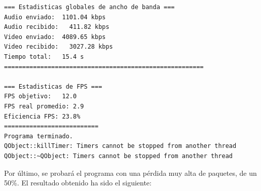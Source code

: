 \begin{adjustbox}{max width=\textwidth}
\begin{lstlisting}[language=bash,basicstyle=\ttfamily\scriptsize]
=== Estadisticas globales de ancho de banda ===
Audio enviado:	1101.04 kbps
Audio recibido:   411.82 kbps
Video enviado:	4089.65 kbps
Video recibido:   3027.28 kbps
Tiempo total: 	15.4 s
=======================================================

=== Estadisticas de FPS ===
FPS objetivo: 	12.0
FPS real promedio: 2.9
Eficiencia FPS:	23.8%
==========================
Programa terminado.
QObject::killTimer: Timers cannot be stopped from another thread
QObject::~QObject: Timers cannot be stopped from another thread
\end{lstlisting}
\end{adjustbox}
\vspace{\baselineskip}

\newpage

Por último, se probará el programa con una pérdida muy alta de paquetes, de un 50\%. El resultado obtenido ha sido el siguiente:
\vspace{\baselineskip}

